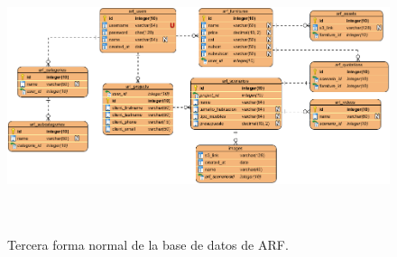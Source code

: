 \begin{figure}[H]
	\centering
	\includegraphics[width=16cm,height=8cm]{imagenes/desarrollo/arquitectura/ERD.png}
	\caption{Tercera forma normal de la base de datos de ARF.}
	\label{fig:erd}
\end{figure}